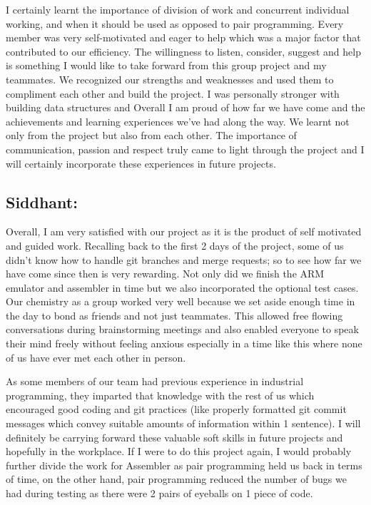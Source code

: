 \documentclass[a4paper]{article}
\begin{document}
I certainly learnt the importance of division of work and concurrent individual working, and when it should be used as opposed to pair programming. Every member was very self-motivated and eager to help which was a major factor that contributed to our efficiency. The willingness to listen, consider, suggest and help is something I would like to take forward from this group project and my teammates.  We recognized our strengths and weaknesses and used them to compliment each other and build the project. I was personally stronger with building data structures and Overall I am proud of how far we have come and the achievements and learning experiences we've had along the way. We learnt not only from the project but also from each other. The importance of communication, passion and respect truly came to light through the project and I will certainly incorporate these experiences in future projects.

\subsection{Siddhant:}
Overall, I am very satisfied with our project as it is the product of self motivated and guided work. Recalling back to the first 2 days of the project, some of us didn't know how to handle git branches and merge requests; so to see how far we have come since then is very rewarding. Not only did we finish the ARM emulator and assembler in time but we also incorporated the optional test cases. Our chemistry as a group worked very well because we set aside enough time in the day to bond as friends and not just teammates. This allowed free flowing conversations during brainstorming meetings and also enabled everyone to speak their mind freely without feeling anxious especially in a time like this where none of us have ever met each other in person.

As some members of our team had previous experience in industrial programming, they imparted that knowledge with the rest of us which encouraged good coding and git practices (like properly formatted git commit messages which convey suitable amounts of information within 1 sentence). I will definitely be carrying forward these valuable soft skills in future projects and hopefully in the workplace. If I were to do this project again, I would probably further divide the work for Assembler as pair programming held us back in terms of time, on the other hand, pair programming reduced the number of bugs we had during testing as there were 2 pairs of eyeballs on 1 piece of code.
\end{document}
